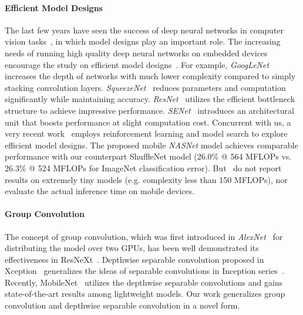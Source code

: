 \documentclass[10pt,twocolumn,letterpaper]{article}
\begin{document}
\paragraph{Efficient Model Designs}
The last few years have seen the success of deep neural networks in computer vision tasks~\cite{krizhevsky2012imagenet,vinyals2015show,ren2015faster}, in which model designs play an important role. The increasing needs of running high quality deep neural networks on embedded devices encourage the study on efficient model designs~\cite{he2015convolutional}.
For example, \emph{GoogLeNet}~\cite{szegedy2015going} increases the depth of networks with much lower complexity compared to simply stacking convolution layers. \emph{SqueezeNet}~\cite{iandola2016squeezenet} reduces parameters and computation significantly while maintaining accuracy. \emph{ResNet}~\cite{he2016deep,he2016identity} utilizes the efficient bottleneck structure to achieve impressive performance. 
\emph{SENet}~\cite{hu2017squeeze} introduces an architectural unit that boosts performance at slight computation cost.
Concurrent with us, a very recent work~\cite{zoph2017learning} employs reinforcement learning and model search to explore efficient model designs. The proposed mobile \emph{NASNet} model achieves comparable performance with our counterpart ShuffleNet model (26.0\% @ 564 MFLOPs vs. 26.3\% @ 524 MFLOPs for ImageNet classification error). But~\cite{zoph2017learning} do not report results on extremely tiny models (e.g. complexity less than 150 MFLOPs), nor evaluate the actual inference time on mobile devices.

\paragraph{Group Convolution}
The concept of group convolution, which was first introduced in \emph{AlexNet}~\cite{krizhevsky2012imagenet} for distributing the model over two GPUs, has been well demonstrated its effectiveness in ResNeXt~\cite{xie2016aggregated}. Depthwise separable convolution proposed in Xception~\cite{chollet2016xception} generalizes the ideas of separable convolutions in Inception series~\cite{szegedy2016rethinking,szegedy2016inception}. Recently, MobileNet~\cite{howard2017mobilenets} utilizes the depthwise separable convolutions and gains state-of-the-art results among lightweight models. Our work generalizes group convolution and depthwise separable convolution in a novel form.
\end{document}
